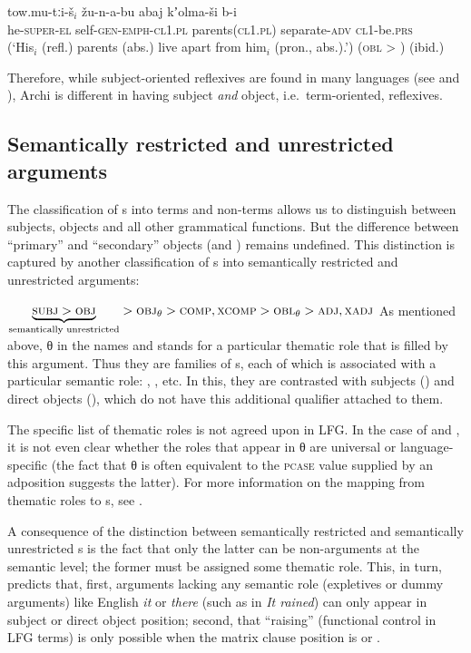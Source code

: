 \documentclass[output=paper]{../langscibook}
\begin{document}
 \ex 
 \gll *tow.mu-tːi-š$_i$ žu-n-a-bu abaj kʼolma-ši b-i\\
 \phantom{*}he-\textsc{super-el} self-\textsc{gen-emph-cl1.pl} parents(\textsc{cl1.pl}) separate-\textsc{adv} \textsc{cl1}-be\textsc{.prs}\\
 \trans (`His$_i$ (refl.) parents (abs.) live apart from him$_i$ (pron., abs.).') (\textsc{obl} > \ABS) (ibid.)
 \z
 \z
 
 \noindent Therefore, while subject-oriented reflexives are found in many languages (see \cite{dalrymple1993} and ), Archi is different in having subject \textit{and} object, i.e.\ term-oriented, reflexives.
 
 \subsection{Semantically restricted and unrestricted arguments\label{sect:gfs:semrest}}
 
 The classification of {\GF}s into terms and non-terms allows us to distinguish between subjects, objects and all other grammatical functions. But the difference between ``primary'' and ``secondary'' objects (\OBJ and {\OBJTHETA}) remains undefined. This distinction is captured by another classification of {\GF}s into semantically restricted and unrestricted arguments:
 
 \ea\label{ex:gfs:restr}
 $\underbrace{\textsc{subj}{} > \textsc{obj}{}}_{\text{semantically unrestricted}} > {\mbox{\textsc{obj}$_{\theta}$}{}} > \textsc{comp}{}, \textsc{xcomp}{} > {\mbox{\textsc{obl}$_{\theta}$}{}} > \textsc{adj}{}, \textsc{xadj}$
 \z
  As mentioned above, θ in the \GF names {\OBJTHETA} and {\OBLTHETA} stands for a particular thematic role that is filled by this argument. Thus they are families of {\GF}s, each of which is associated with a particular semantic role: {}, {}, etc. In this, they are contrasted with subjects  (\SUBJ) and direct objects (\OBJ), which do not have this additional qualifier attached to them.

 The specific list of thematic roles is not agreed upon in LFG. In the case of \OBJTHETA and \OBLTHETA, it is not even clear whether the roles that appear in θ are universal or language-specific (the fact that θ is often equivalent to the \textsc{pcase} value supplied by an adposition suggests the latter). For more information on the mapping from thematic roles to {\GF}s, see .
 
 A consequence of the distinction between semantically restricted and semantically unrestricted {\GF}s is the fact that only the latter can be non-arguments at the semantic level; the former must be assigned some thematic role. This, in turn, predicts that, first, arguments lacking any semantic role (expletives or dummy arguments) like English \textit{it} or \textit{there} (such as in \textit{It rained}) can only appear in subject or direct object position; second, that ``raising'' (functional control in LFG terms) is only possible when the matrix clause position is \SUBJ or \OBJ.
 
\end{document}
